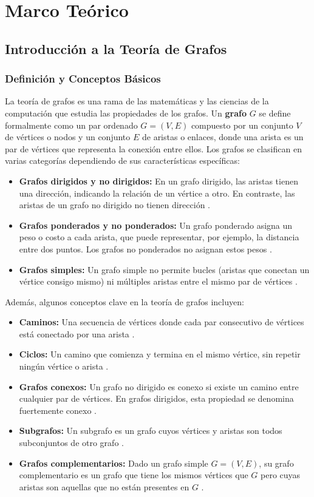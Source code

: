 \chapter{Marco Teórico}

\section{Introducción a la Teoría de Grafos}
\subsection{Definición y Conceptos Básicos}

La teoría de grafos es una rama de las matemáticas y las ciencias de la computación que estudia las propiedades de los grafos. Un \textbf{grafo} $G$ se define formalmente como un par ordenado $G = (V, E)$ compuesto por un conjunto $V$ de vértices o nodos y un conjunto $E$ de aristas o enlaces, donde una arista es un par de vértices que representa la conexión entre ellos. Los grafos se clasifican en varias categorías dependiendo de sus características específicas:

\begin{itemize}
    \item \textbf{Grafos dirigidos y no dirigidos:} En un grafo dirigido, las aristas tienen una dirección, indicando la relación de un vértice a otro. En contraste, las aristas de un grafo no dirigido no tienen dirección .
    \item \textbf{Grafos ponderados y no ponderados:} Un grafo ponderado asigna un peso o costo a cada arista, que puede representar, por ejemplo, la distancia entre dos puntos. Los grafos no ponderados no asignan estos pesos .
    \item \textbf{Grafos simples:} Un grafo simple no permite bucles (aristas que conectan un vértice consigo mismo) ni múltiples aristas entre el mismo par de vértices .
\end{itemize}

Además, algunos conceptos clave en la teoría de grafos incluyen:

\begin{itemize}
    \item \textbf{Caminos:} Una secuencia de vértices donde cada par consecutivo de vértices está conectado por una arista .
    \item \textbf{Ciclos:} Un camino que comienza y termina en el mismo vértice, sin repetir ningún vértice o arista .
    \item \textbf{Grafos conexos:} Un grafo no dirigido es conexo si existe un camino entre cualquier par de vértices. En grafos dirigidos, esta propiedad se denomina fuertemente conexo .
    \item \textbf{Subgrafos:} Un subgrafo es un grafo cuyos vértices y aristas son todos subconjuntos de otro grafo .
    \item \textbf{Grafos complementarios:} Dado un grafo simple $G = (V, E)$, su grafo complementario es un grafo que tiene los mismos vértices que $G$ pero cuyas aristas son aquellas que no están presentes en $G$ .
\end{itemize}

